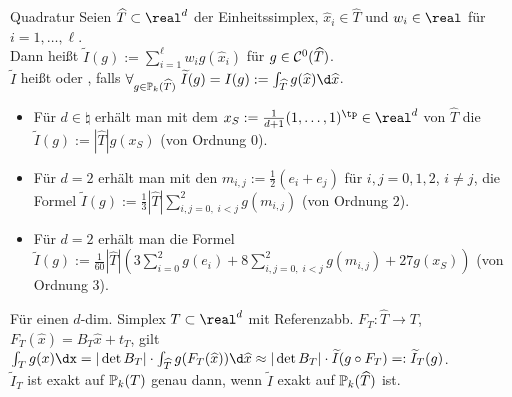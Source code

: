 \begin{Def}{Quadratur}
    Seien $\widehat{T} \subset \real^d$ der Einheitssimplex,
    $\widehat{x}_i \in \widehat{T}$ und $w_i \in \real$ für $i = 1, \dotsc, \ell$.\\
    Dann heißt $\widetilde{I}(g) := \sum_{i=1}^\ell w_i g(\widehat{x}_i)$
     für $g \in \mathcal{C}^0(\widehat{T})$.\\
    $\widetilde{I}$ heißt  oder
    , falls $\forall_{g \in \PP_k(\widehat{T})}\;
    \widetilde{I}(g) = I(g) := \int_{\widehat{T}} g(\widehat{x})\d\widehat{x}$.
\end{Def}

\begin{Bsp}
    \begin{itemize}
        \item
        Für $d \in \natural$ erhält man mit dem 
        $x_S := \frac{1}{d+1} (1, \dotsc, 1)^\tp \in \real^d$ von $\widehat{T}$
        die  $\widetilde{I}(g) := |\widehat{T}| g(x_S)$
        (von Ordnung $0$).
        
        \item
        Für $d = 2$ erhält man mit den 
        $m_{i,j} := \frac{1}{2} (e_i + e_j)$ für $i, j = 0, 1, 2$, $i \not= j$,
        die Formel
        $\widetilde{I}(g) := \frac{1}{3} |\widehat{T}| \sum_{i,j=0,\; i<j}^2 g(m_{i,j})$
        (von Ordnung $2$).
        
        \item
        Für $d = 2$ erhält man die Formel\\
        $\widetilde{I}(g) := \frac{1}{60} |\widehat{T}|
        (3 \sum_{i=0}^2 g(e_i) + 8 \sum_{i,j=0,\; i<j}^2 g(m_{i,j}) + 27 g(x_S))$
        (von Ordnung $3$).
    \end{itemize}
\end{Bsp}

\linie

\begin{Bem}
    Für einen $d$-dim. Simplex $T \subset \real^d$ mit Referenzabb.
    $F_T\colon \widehat{T} \to T$, $F_T(\widehat{x}) = B_T \widehat{x} + t_T$, gilt
    $\int_T g(x)\dx = |\det B_T| \cdot \int_{\widehat{T}} g(F_T(\widehat{x})) \d\widehat{x}
    \approx |\det B_T| \cdot \widetilde{I}(g \circ F_T) =: \widetilde{I}_T(g)$.\\
    $\widetilde{I}_T$ ist exakt auf $\mathbb{P}_k(T)$ genau dann,
    wenn $\widetilde{I}$ exakt auf $\mathbb{P}_k(\widehat{T})$ ist.
\end{Bem}

